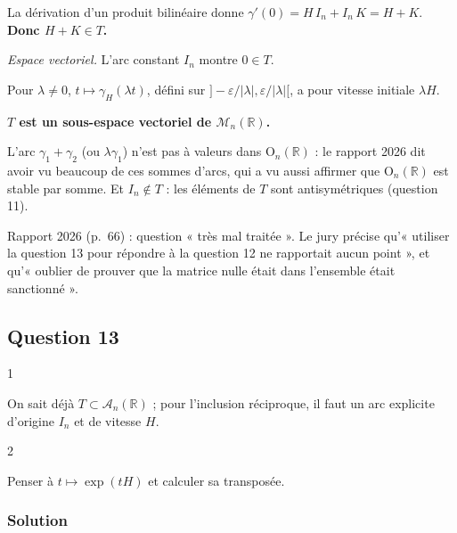 \documentclass[11pt,a4paper]{article}
\begin{document}
La dérivation d'un produit bilinéaire donne \(\gamma'(0)=H\,I_n+I_n\,K=H+K\). \textbf{Donc \(H+K\in T\).}

\emph{Espace vectoriel.} L'arc constant \(I_n\) montre \(0\in T\).

Pour \(\lambda\neq0\), \(t\mapsto\gamma_H(\lambda t)\), défini sur \(]-\varepsilon/|\lambda|,\varepsilon/|\lambda|[\), a pour vitesse initiale \(\lambda H\).

\textbf{\(T\) est un sous-espace vectoriel de \({\mathcal{M}}_n(\mathbb{R})\).}

\begin{piege}

L'arc \(\gamma_1+\gamma_2\) (ou \(\lambda\gamma_1\)) n'est pas à valeurs dans \({\mathrm{O}}_n(\mathbb{R})\) : le rapport 2026 dit avoir vu beaucoup de ces sommes d'arcs, qui a vu aussi affirmer que \({\mathrm{O}}_n(\mathbb{R})\) est stable par somme. Et \(I_n\notin T\) : les éléments de \(T\) sont antisymétriques (question 11).

\end{piege}

\begin{jury}

Rapport 2026 (p.~66) : question « très mal traitée ». Le jury précise qu'« utiliser la question 13 pour répondre à la question 12 ne rapportait aucun point », et qu'« oublier de prouver que la matrice nulle était dans l'ensemble était sanctionné ».

\end{jury}

\hypertarget{question-13}{%
\subsection{Question 13}\label{question-13}}

\begin{indication}{1}

On sait déjà \(T\subset{\mathcal{A}}_n(\mathbb{R})\) ; pour l'inclusion réciproque, il faut un arc explicite d'origine \(I_n\) et de vitesse \(H\).

\end{indication}

\begin{indication}{2}

Penser à \(t\mapsto\exp(tH)\) et calculer sa transposée.

\end{indication}

\hypertarget{solution-12}{%
\subsubsection{Solution}\label{solution-12}}
\end{document}
